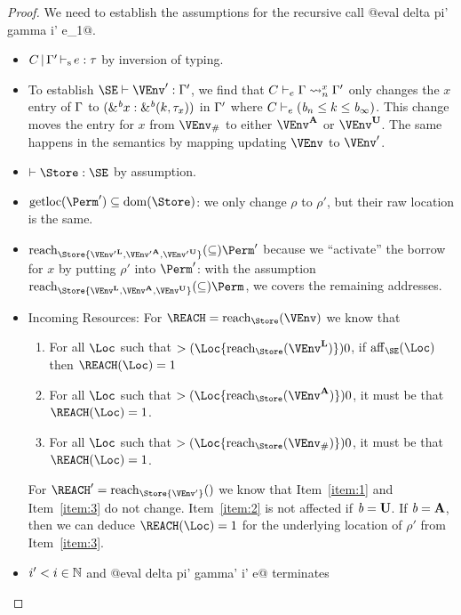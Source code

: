 \begin{proof}
  We need to establish the assumptions for the recursive call
  @eval delta pi' gamma i' e_1@.
  \begin{itemize}
  \item $\inferS{C}{\E'}{e}{\tau}$ by inversion of typing.
  \item To establish $\SE \vdash \VEnv' : \E'$, we find that
    $\lregion{C}{x}{\E}{\E'}$ only changes the $x$ entry of $\E$ to
    ${\bvar{\borrow[\BORROW]{x}}{\borrowty[\BORROW] k{\tau_x}}}$ in
    $\E'$ where $C \vdash_e {(\BORROW_n\lk k\lk\BORROW_\infty)}$. This
    change moves the entry for $x$ from $\Suspended\VEnv$ to either
    $\MutableBorrows\VEnv$ or $\ImmutableBorrows\VEnv$. The same
    happens in the semantics by mapping updating $\VEnv$ to $\VEnv'$.
  \item $\vdash \Store : \SE$ by assumption.
  \item $\Rawloc{\Perm'} \subseteq \Dom\Store$: we only change
    $\rho$ to $\rho'$, but their raw location is the same.
  \item $\Reach\Store{\Active{\VEnv'}, \MutableBorrows{\VEnv'},
      \ImmutableBorrows{\VEnv'}} \subseteq \Perm'$ because we
    ``activate'' the borrow for $x$ by putting $\rho'$ into $\Perm'$:
    with the assumption $\Reach\Store{\Active\VEnv, \MutableBorrows\VEnv,
      \ImmutableBorrows\VEnv} \subseteq \Perm$, we covers the remaining addresses.
  \item Incoming Resources: For $\REACH = \Reach\Store\VEnv$ we know that
    \begin{enumerate}
    \item\label{item:1}
      For all $\Loc$ such that $\MultiNumber\Loc{\Reach{\Store}{\Active\VEnv}} >0$,
      if $\Affine{\SE}\Loc$ then $\MultiNumber\Loc\REACH= 1$
    \item\label{item:2} For all $\Loc$ such that $
      \MultiNumber\Loc{\Reach{\Store}{\MutableBorrows\VEnv}} >0$, it
      must be that $\MultiNumber\Loc\REACH=1$.
    \item\label{item:3} For all $\Loc$ such that $
      \MultiNumber\Loc{\Reach{\Store}{\Suspended\VEnv}} >0$, it
      must be that $\MultiNumber\Loc\REACH=1$.
    \end{enumerate}
    For $\REACH' = \Reach\Store{\VEnv'}$ we know that
    Item~\ref{item:1} and Item~\ref{item:3} do not change. Item~\ref{item:2} is not
    affected if $\BORROW=\IBORROW$. If $\BORROW=\MBORROW$, then we
    can deduce $\MultiNumber\Loc\REACH=1$ for the
    underlying location of $\rho'$ from Item~\ref{item:3}.
  \item  $i'<i\in\Nat$ and @eval delta pi' gamma' i' e@ terminates

\end{itemize}
\end{proof}
